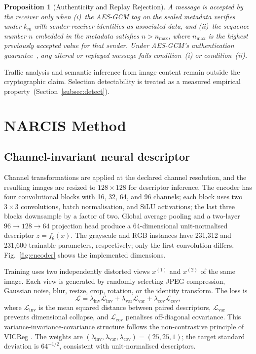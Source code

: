 \documentclass[10pt,journal]{IEEEtran}
\newtheorem{proposition}{Proposition}
\begin{document}
\begin{proposition}[Authenticity and Replay Rejection]
\label{prop:auth}
A message is accepted by the receiver only when
(i)~the AES-GCM tag on the sealed metadata verifies under $k_m$
    with sender-receiver identities as associated data, and
(ii)~the sequence number $n$ embedded in the metadata satisfies
    $n>n_{\max}$, where $n_{\max}$ is the highest previously accepted
    value for that sender. Under AES-GCM's authentication
    guarantee~\cite{nist2007gcm}, any altered or replayed message
    fails condition~(i) or condition~(ii).
\end{proposition}

Traffic analysis and semantic inference from image content remain
outside the cryptographic claim. Selection detectability is treated
as a measured empirical property~(Section~\ref{subsec:detect}).

\section{NARCIS Method}
\label{sec:method}

\subsection{Channel-invariant neural descriptor}

Channel transformations are applied at the declared channel resolution,
and the resulting images are resized to $128\times128$ for descriptor
inference. The encoder has four convolutional blocks with 16, 32, 64,
and 96 channels; each block uses two $3\times3$ convolutions, batch
normalisation, and SiLU activations; the last three blocks downsample
by a factor of two. Global average pooling and a two-layer
$96\to128\to64$ projection head produce a 64-dimensional unit-normalised
descriptor $z=f_\theta(x)$. The grayscale and RGB instances have 231{,}312
and 231{,}600 trainable parameters, respectively; only the first
convolution differs. Fig.~\ref{fig:encoder} shows the implemented
dimensions.

Training uses two independently distorted views $x^{(1)}$ and $x^{(2)}$
of the same image. Each view is generated by randomly selecting JPEG
compression, Gaussian noise, blur, resize, crop, rotation, or the
identity transform. The loss is
\begin{equation}
\mathcal{L}=
\lambda_{\mathrm{inv}}\mathcal{L}_{\mathrm{inv}}+
\lambda_{\mathrm{var}}\mathcal{L}_{\mathrm{var}}+
\lambda_{\mathrm{cov}}\mathcal{L}_{\mathrm{cov}},
\label{eq:loss}
\end{equation}
where $\mathcal{L}_{\mathrm{inv}}$ is the mean squared distance between
paired descriptors, $\mathcal{L}_{\mathrm{var}}$ prevents dimensional
collapse, and $\mathcal{L}_{\mathrm{cov}}$ penalises off-diagonal
covariance. This variance-invariance-covariance structure follows the
non-contrastive principle of VICReg \cite{bardes2022vicreg}. The weights
are $(\lambda_{\mathrm{inv}},\lambda_{\mathrm{var}},\lambda_{\mathrm{cov}})
=(25,25,1)$; the target standard deviation is $64^{-1/2}$, consistent
with unit-normalised descriptors.
\end{document}
